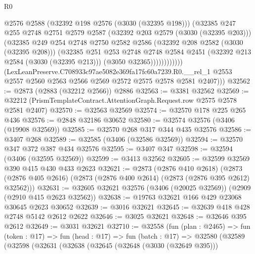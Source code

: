 \begin{lexlean}{R0}
\begin{coremodule}
                        @2576
                        @2588
                        (@32392 @198 @2576 (@3030 (@32395 @198)))
                        (@32385
                          @247
                          @255
                          @2748
                          @2751
                          @2579
                          @2587
                          (@32392 @203 @2579 (@3030 (@32395 @203)))
                          (@32385
                            @249
                            @254
                            @2748
                            @2750
                            @2582
                            @2586
                            (@32392 @208 @2582 (@3030 (@32395 @208)))
                            (@32385
                              @251
                              @253
                              @2748
                              @2748
                              @2584
                              @2451
                              (@32392 @213 @2584 (@3030 (@32395 @213)))
                              (@3050 @32365))))))))))))
        (LexLeanPreserve.C708933c97ae5082e369fa17fc60a7239.R0.__rel_1
          @2553
          @2557
          @2560
          @2563
          @2566
          @2569
          @2572
          @2575
          @2578
          @2581
          @2407)))
@32562 := @2873 (@2883 (@32212 @2566)) @2886
@32563 := @3381 @32562
@32569 := @32212 (PrismTemplateContract.AttentionGraph.Request.row @2575 @2578 @2581 @2407)
@32570 := @32563 @32569
@32574 := @32570 @178 @225 @265 @436
@32576 := @2848 @32186 @30652
@32580 := @32574 @32576 (@3406 (@19908 @32569))
@32585 := @32570 @268 @317 @344 @435 @32576
@32586 := @3407 @268
@32589 := @32585 (@3406 (@32586 @32569))
@32594 := @32570 @347 @372 @387 @434 @32576
@32595 := @3407 @347
@32598 := @32594 (@3406 (@32595 @32569))
@32599 := @3413 @32562
@32605 := @32599 @32569 @390 @415 @430 @433 @2623
@32621 := @2873
    (@2876 @410 @2618)
    (@2873 (@2876 @405 @2616) (@2873 (@2876 @400 @2614) (@2873 (@2876 @395 @2612) @32562)))
@32631 := @32605 @32621 @32576 (@3406 (@20025 @32569)) (@2909 (@2910 @415 @2623 @32562))
@32638 := @19763 @32621 @166 @429 @23068 @30645 @2623 @30652
@32639 := @3016 @32621
@32645 := @32639 @418 @428 @2748 @5142 @2612 @2622
@32646 := @3025 @32621
@32648 := @32646 @395 @2612
@32649 := @3031 @32621
@32710 := @32558
    (fun (plan : @2465) =>
    fun (token : @17) =>
    fun (head : @17) =>
    fun (batch : @17) =>
    @32580
      (@32589
        (@32598
          (@32631
            (@32638
              (@32645
                (@32648 (@3030 (@32649 @395)))

\end{coremodule}
\end{lexlean}

